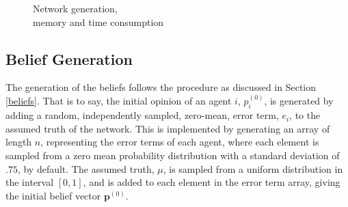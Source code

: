 \documentclass[a4paper, 12pt]{report}
\newcommand{\beli}[3][2]{p_{#2}^{(#3)}}
\begin{document}
\begin{figure}[!htbp]
    \begin{minipage}{.45\linewidth}
    \centering
    \end{minipage}%
    \begin{minipage}{.45\linewidth}
    \centering
    \end{minipage}\par\medskip
    \caption{Network generation, \\ memory and time consumption}
\end{figure}

\newpage
\subsection{Belief Generation}

The generation of the beliefs follows the procedure as discussed in Section \ref{beliefs}. That is to say, the initial opinion of an agent $i$, $\beli{i}{0}$, is generated by adding a random, independently sampled, zero-mean, error term, $e_i$, to the assumed truth of the network. This is implemented by generating an array of length $n$, representing the error terms of each agent, where each element is sampled from a zero mean probability distribution with a standard deviation of $.75$, by default. The assumed truth, $\mu$, is sampled from a uniform distribution in the interval $[0, 1]$, and is added to each element in the error term array, giving the initial belief vector $\bm{p}^{(0)}$.
\end{document}
